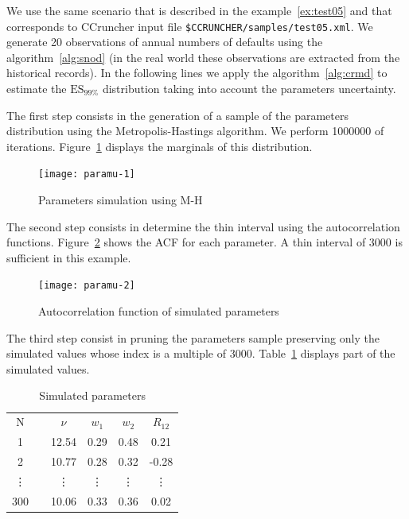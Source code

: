 \documentclass[11pt,fleqn]{book} %
\begin{document}
\begin{example}
	\label{ex:paramu}
	We use the same scenario that is described in the example~\ref{ex:test05} 
	and that corresponds to CCruncher input file 
	\texttt{\$CCRUNCHER/samples/test05.xml}. 
	We generate 20 observations of annual numbers of defaults using the 
	algorithm~\ref{alg:snod} (in the real world these observations are 
	extracted from the historical records). 
	In the following lines we apply the algorithm~\ref{alg:crmd} to estimate 
	the $\text{ES}_{99\%}$ distribution taking into account the parameters 
	uncertainty. 

	The first step consists in the generation of a sample of the parameters 
	distribution using the Metropolis-Hastings algorithm. We perform 1000000
	of iterations. Figure~\ref{fig:paramu1} displays the marginals of this 
	distribution.
	\begin{figure}[!ht]
		\centering
		\texttt{[image: paramu-1]}
		\caption{Parameters simulation using M-H}
		\label{fig:paramu1}
	\end{figure}
	
	The second step consists in determine the thin interval using the 
	autocorrelation functions. Figure~\ref{fig:paramu2} shows the ACF for 
	each parameter. A thin interval of 3000 is sufficient in this example. 
	\begin{figure}[ht]
		\centering
		\texttt{[image: paramu-2]}
		\caption{Autocorrelation function of simulated parameters}
		\label{fig:paramu2}
	\end{figure}
	
	The third step consist in pruning the parameters sample preserving 
	only the simulated values whose index is a multiple of 3000. 
	Table~\ref{tab:paramu3} displays part of the simulated values.
	\begin{table}[!ht]
		\centering
		\begin{tabular}{cc|c|c|c|c|}
			\cline{1-1} \cline{3-6}
			\multicolumn{1}{|c|}{N} & & $\nu$ & $w_1$ & $w_2$ & $R_{12}$ \\
			\cline{1-1} \cline{3-6}
			\multicolumn{1}{|c|}{1} & & 12.54 & 0.29 & 0.48 & 0.21 \\
			\cline{1-1} \cline{3-6}
			\multicolumn{1}{|c|}{2} & & 10.77 & 0.28 & 0.32 & -0.28 \\
			\cline{1-1} \cline{3-6}
			\multicolumn{1}{|c|}{\vdots} & & \vdots & \vdots & \vdots & \vdots \\
			\cline{1-1} \cline{3-6}
			\multicolumn{1}{|c|}{300} & & 10.06 & 0.33 & 0.36 & 0.02 \\
			\cline{1-1} \cline{3-6}
		\end{tabular}
		\caption{Simulated parameters}
		\label{tab:paramu3}
	\end{table}


\end{example}
\end{document}
